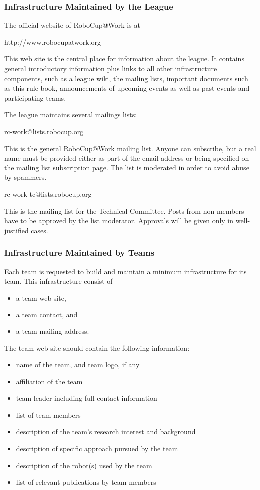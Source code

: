 \subsubsection{Infrastructure Maintained by the League}
The official website of RoboCup@Work is at

http://www.robocupatwork.org

This web site is the central place for information about the league. It contains general introductory information plus links to all other infrastructure components, such as a league wiki, the mailing lists, important documents such as this rule book, announcements of upcoming events as well as past events and participating teams.
\par
The league maintains several mailings lists:
\par
rc-work@lists.robocup.org
\par
This is the general RoboCup@Work mailing list. Anyone can subscribe, but a real name must be provided either as part of the email address or being specified on the mailing list subscription page. The list is moderated in order to avoid abuse by spammers. 
\par
rc-work-tc@lists.robocup.org
\par
This is the mailing list for the Technical Committee. Posts from non-members have to be approved by the list moderator. Approvals will be given only in well-justified cases.

\subsubsection{Infrastructure Maintained by Teams}
Each team is requested to build and maintain a minimum infrastructure for its team. This infrastructure consist of 

\begin{itemize}
	\item a team web site,
	\item a team contact, and
	\item a team mailing address.
\end{itemize}

The team web site should contain the following information:

\begin{itemize}
	\item name of the team, and team logo, if any
	\item affiliation of the team
	\item team leader including full contact information
	\item list of team members
	\item description of the team’s research interest and background
	\item description of specific approach pursued by the team
	\item description of the robot(s) used by the team
	\item list of relevant publications by team members

\end{itemize}

